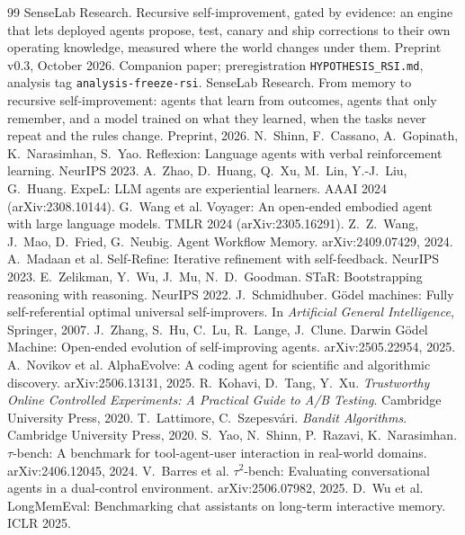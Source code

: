 \documentclass[11pt]{article}
\newcommand{\code}[1]{\texttt{#1}}
\begin{document}
\begin{thebibliography}{99}\small
{} SenseLab Research. Recursive self-improvement, gated by evidence: an engine
that lets deployed agents propose, test, canary and ship corrections to their own operating
knowledge, measured where the world changes under them. Preprint v0.3, October 2026. Companion
paper; preregistration \code{HYPOTHESIS\_RSI.md}, analysis tag \code{analysis-freeze-rsi}.
 SenseLab Research. From memory to recursive self-improvement: agents that
learn from outcomes, agents that only remember, and a model trained on what they learned, when
the tasks never repeat and the rules change. Preprint, 2026.
 N.~Shinn, F.~Cassano, A.~Gopinath, K.~Narasimhan, S.~Yao. Reflexion: Language
agents with verbal reinforcement learning. NeurIPS 2023.
 A.~Zhao, D.~Huang, Q.~Xu, M.~Lin, Y.-J.~Liu, G.~Huang. ExpeL: LLM agents are
experiential learners. AAAI 2024 (arXiv:2308.10144).
 G.~Wang et al. Voyager: An open-ended embodied agent with large language models.
TMLR 2024 (arXiv:2305.16291).
 Z.~Z.~Wang, J.~Mao, D.~Fried, G.~Neubig. Agent Workflow Memory. arXiv:2409.07429,
2024.
 A.~Madaan et al. Self-Refine: Iterative refinement with self-feedback.
NeurIPS 2023.
 E.~Zelikman, Y.~Wu, J.~Mu, N.~D.~Goodman. STaR: Bootstrapping reasoning with
reasoning. NeurIPS 2022.
 J.~Schmidhuber. Gödel machines: Fully self-referential optimal universal
self-improvers. In \emph{Artificial General Intelligence}, Springer, 2007.
 J.~Zhang, S.~Hu, C.~Lu, R.~Lange, J.~Clune. Darwin Gödel Machine: Open-ended
evolution of self-improving agents. arXiv:2505.22954, 2025.
 A.~Novikov et al. AlphaEvolve: A coding agent for scientific and algorithmic
discovery. arXiv:2506.13131, 2025.
 R.~Kohavi, D.~Tang, Y.~Xu. \emph{Trustworthy Online Controlled Experiments: A
Practical Guide to A/B Testing}. Cambridge University Press, 2020.
 T.~Lattimore, C.~Szepesv\'ari. \emph{Bandit Algorithms}. Cambridge University
Press, 2020.
 S.~Yao, N.~Shinn, P.~Razavi, K.~Narasimhan. $\tau$-bench: A benchmark for
tool-agent-user interaction in real-world domains. arXiv:2406.12045, 2024.
 V.~Barres et al. $\tau^2$-bench: Evaluating conversational agents in a
dual-control environment. arXiv:2506.07982, 2025.
 D.~Wu et al. LongMemEval: Benchmarking chat assistants on long-term interactive
memory. ICLR 2025.
\end{thebibliography}
\end{document}
